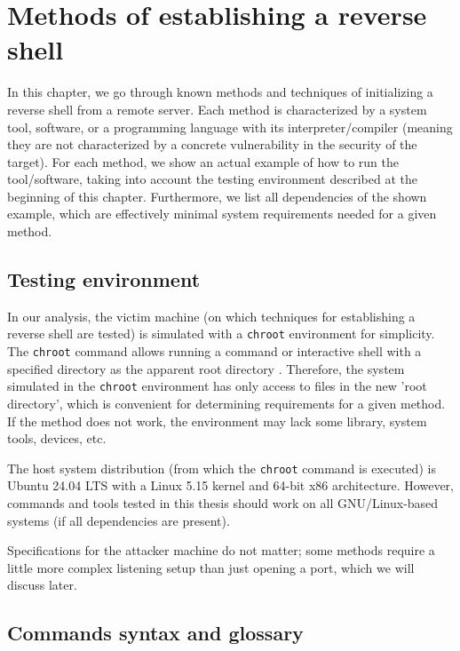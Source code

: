 \newcommand{\commandpath}[1]{chapters/chapter1/commands/#1}

\chapter{Methods of establishing a reverse shell}

\label{chap:methods}

In this chapter, we go through known methods and techniques of initializing a reverse shell from a remote server. Each method is characterized by a system tool, software, or a programming language with its interpreter/compiler (meaning they are not characterized by a concrete vulnerability in the security of the target). For each method, we show an actual example of how to run the tool/software, taking into account the testing environment described at the beginning of this chapter. Furthermore, we list all dependencies of the shown example, which are effectively minimal system requirements needed for a given method.

\section{Testing environment}

In our analysis, the victim machine (on which techniques for establishing a reverse shell are tested) is simulated with a \texttt{chroot} environment for simplicity. The \texttt{chroot} command allows running a command or interactive shell with a specified directory as the apparent root directory \cite{chroot-man}. Therefore, the system simulated in the \texttt{chroot} environment has only access to files in the new 'root directory', which is convenient for determining requirements for a given method. If the method does not work, the environment may lack some library, system tools, devices, etc.

The host system distribution (from which the \texttt{chroot} command is executed) is Ubuntu 24.04 LTS with a Linux 5.15 kernel and 64-bit x86 architecture. However, commands and tools tested in this thesis should work on all GNU/Linux-based systems (if all dependencies are present).

Specifications for the attacker machine do not matter; some methods require a little more complex listening setup than just opening a port, which we will discuss later.

\section{Commands syntax and glossary}

